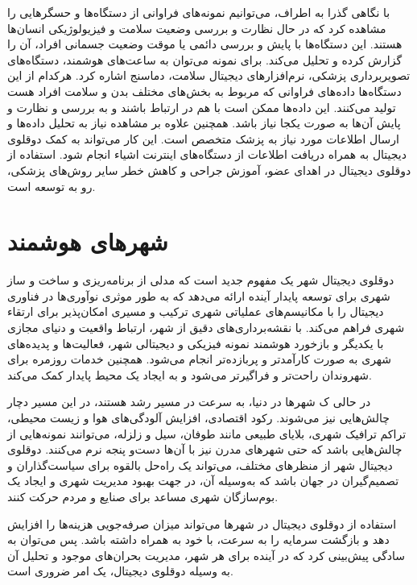با نگاهی گذرا به اطراف،‌ می‌توانیم نمونه‌های فراوانی از دستگاه‌ها و حسگر‌هایی را مشاهده کرد که در حال نظارت و بررسی وضعیت سلامت و فیزیولوژیکی انسان‌ها هستند. این دستگاه‌ها با پایش و بررسی دائمی یا موقت وضعیت جسمانی افراد، آن‌ را گزارش کرده و تحلیل می‌کند. برای نمونه می‌توان به ساعت‌های هوشمند، دستگاه‌های تصویربرداری پزشکی، نرم‌افزار‌‌های دیجیتال سلامت، دماسنج اشاره کرد. هرکدام از این دستگاه‌ها داده‌های فراوانی که مربوط به بخش‌های مختلف بدن و سلامت افراد هست تولید می‌کنند. این داده‌ها ممکن است با هم در ارتباط باشند و به بررسی و نظارت و پایش آن‌ها به صورت یکجا نیاز باشد. همچنین علاوه بر مشاهده نیاز به تحلیل داده‌ها و ارسال اطلاعات مورد نیاز به پزشک متخصص است. این کار می‌تواند به کمک دوقلوی دیجیتال به همراه دریافت اطلاعات از دستگاه‌های اینترنت اشیاء انجام شود. استفاده از دوقلوی دیجیتال در اهدای عضو، آموزش جراحی و کاهش خطر سایر روش‌های پزشکی، رو به توسعه است.


\section{شهرهای هوشمند}

دوقلوی دیجیتال شهر یک مفهوم جدید است که مدلی از برنامه‌ریزی و ساخت و ساز شهری برای توسعه پایدار آینده ارائه می‌دهد که به طور موثری نوآوری‌ها در فناوری دیجیتال را با مکانیسم‌های عملیاتی شهری ترکیب و مسیری امکان‌پذیر برای ارتقاء شهری فراهم می‌کند. 
با نقشه‌برداری‌های دقیق از شهر، ارتباط واقعیت و دنیای مجازی با یکدیگر و بازخورد هوشمند نمونه‌ فیزیکی و دیجیتالی شهر، فعالیت‌ها و پدیده‌های شهری به صورت کارآمد‌تر و پربازده‌تر انجام می‌شود. همچنین خدمات روزمره برای شهروندان راحت‌تر و فراگیر‌تر می‌شود و به ایجاد یک محیط پایدار کمک می‌کند.

در حالی ک شهر‌ها در دنیا، به سرعت در مسیر رشد هستند، در این مسیر دچار چالش‌هایی نیز می‌شوند. رکود اقتصادی، افزایش آلودگی‌های هوا و زیست محیطی، تراکم ترافیک شهری، بلایای طبیعی مانند طوفان، سیل و زلزله، می‌توانند نمونه‌هایی از چالش‌هایی باشد که حتی شهر‌های مدرن نیز با آن‌ها دست‌و پنجه نرم می‌کنند. دوقلوی دیجیتال شهر از منظر‌های مختلف، می‌تواند یک راه‌حل بالقوه برای سیاست‌گذاران و تصمیم‌گیران در جهان باشد که به‌وسیله آن، در جهت بهبود مدیریت شهری و ایجاد یک بوم‌سازگان شهری مساعد برای صنایع و مردم حرکت کنند.

استفاده از دوقلوی دیجیتال در شهر‌ها می‌تواند میزان صرفه‌جویی هزینه‌ها را افزایش دهد و بازگشت سرمایه را به سرعت، با خود به همراه داشته‌ باشد. پس می‌توان به سادگی پیش‌بینی کرد که در آینده برای هر شهر، مدیریت بحران‌های موجود و تحلیل آن به وسیله دوقلوی دیجیتال، یک امر ضروری است.

